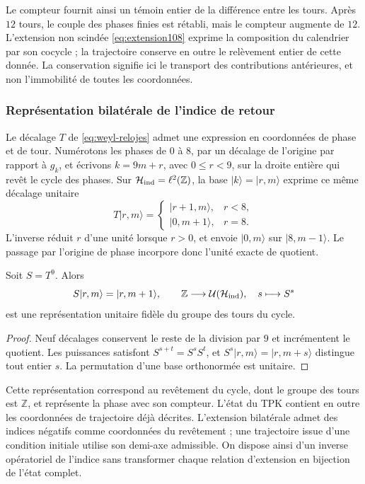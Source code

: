 Le compteur fournit ainsi un témoin entier de la différence entre les
tours. Après \(12\) tours, le couple des phases finies est rétabli, mais
le compteur augmente de \(12\). L'extension non scindée
\eqref{eq:extension108} exprime la composition du calendrier par son
cocycle ; la trajectoire conserve en outre le relèvement entier de cette donnée.
La conservation signifie ici le transport des contributions antérieures,
et non l'immobilité de toutes les coordonnées.

\subsubsection{Représentation bilatérale de l'indice de retour}

Le décalage \(T\) de \eqref{eq:weyl-relojes} admet une
expression en coordonnées de phase et de tour. Numérotons les phases de \(0\) à
\(8\), par un décalage de l'origine par rapport à \(g_k\), et
écrivons \(k=9m+r\), avec \(0\leq r<9\), sur la droite entière
qui revêt le cycle des phases. Sur
\(\mathcal H_{\rm ind}=\ell^2(\mathbb Z)\), la base
\(|k\rangle=|r,m\rangle\) exprime ce même décalage unitaire
\[
 T|r,m\rangle=
 \begin{cases}
 |r+1,m\rangle,&r<8,\\
 |0,m+1\rangle,&r=8.
 \end{cases}
\]
L'inverse réduit \(r\) d'une unité lorsque \(r>0\), et envoie
\(|0,m\rangle\) sur \(|8,m-1\rangle\). Le passage par l'origine de phase
incorpore donc l'unité exacte de quotient.

\begin{proposition}
\label{mono-ampl:representacion}
Soit \(S=T^9\). Alors
\[
 S|r,m\rangle=|r,m+1\rangle,\qquad
 \mathbb Z\longrightarrow\mathcal U(\mathcal H_{\rm ind}),
 \quad s\longmapsto S^s
\]
est une représentation unitaire fidèle du groupe des tours du cycle.
\end{proposition}
\begin{proof}
Neuf décalages conservent le reste de la division par \(9\) et
incrémentent le quotient. Les puissances satisfont
\(S^{s+t}=S^sS^t\), et \(S^s|r,m\rangle=|r,m+s\rangle\) distingue
tout entier \(s\). La permutation d'une base orthonormée est unitaire.
\end{proof}

Cette représentation correspond au revêtement du cycle, dont le groupe
des tours est \(\mathbb Z\), et représente la phase avec son compteur. L'état
du TPK contient en outre les coordonnées de trajectoire déjà décrites.
L'extension bilatérale admet des indices négatifs comme coordonnées du
revêtement ; une trajectoire issue d'une condition initiale utilise
son demi-axe admissible. On dispose ainsi d'un inverse opératoriel
de l'indice sans transformer chaque relation d'extension en bijection de
l'état complet.

